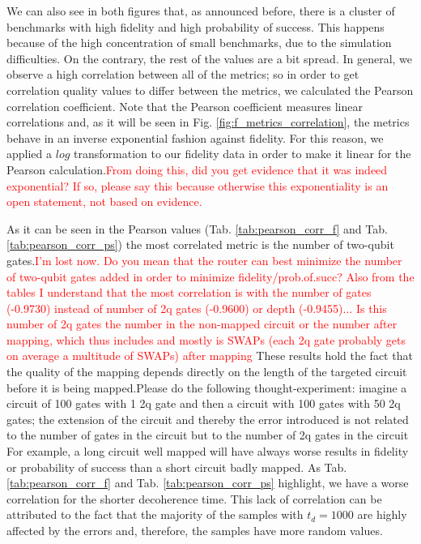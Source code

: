 We can also see in both figures that, as announced before, there is a cluster of benchmarks with high fidelity and high probability of success.
This happens because of the high concentration of small benchmarks, due to the simulation difficulties.
On the contrary, the rest of the values are a bit spread.
In general, we observe a high correlation between all of the metrics; so in order to get correlation quality values to differ between the metrics, we calculated the Pearson correlation coefficient.
Note that the Pearson coefficient measures linear correlations and, as it will be seen in Fig. \ref{fig:f_metrics_correlation}, the metrics behave in an inverse exponential fashion against fidelity.
For this reason, we applied a \(log\) transformation to our fidelity data in order to make it linear for the Pearson calculation.\textcolor{red}{From doing this, did you get evidence that it was indeed exponential? If so, please say this because otherwise this exponentiality is an open statement, not based on evidence.}


As it can be seen in the Pearson values (Tab. \ref{tab:pearson_corr_f} and Tab. \ref{tab:pearson_corr_ps}) the most correlated metric is the number of two-qubit gates.\textcolor{red}{I'm lost now. Do you mean that the router can best minimize the number of two-qubit gates added in order to minimize fidelity/prob.of.succ? Also from the tables I understand that the most correlation is with the number of gates (-0.9730) instead of number of 2q gates (-0.9600) or depth (-0.9455)... Is this number of 2q gates the number in the non-mapped circuit or the number after mapping, which thus includes and mostly is SWAPs (each 2q gate probably gets on average a multitude of SWAPs) after mapping}
These results hold the fact that the quality of the mapping depends directly on the length of the targeted circuit before it is being mapped.\textcolor{}{Please do the following thought-experiment: imagine a circuit of 100 gates with 1 2q gate and then a circuit with 100 gates with 50 2q gates; the extension of the circuit and thereby the error introduced is not related to the number of gates in the circuit but to the number of 2q gates in the circuit}
For example, a long circuit well mapped will have always worse results in fidelity or probability of success than a short circuit badly mapped.
As Tab. \ref{tab:pearson_corr_f} and Tab. \ref{tab:pearson_corr_ps} highlight, we have a worse correlation for the shorter decoherence time.
This lack of correlation can be attributed to the fact that the majority of the samples with \(t_d = 1000\) are highly affected by the errors and, therefore, the samples have more random values.

